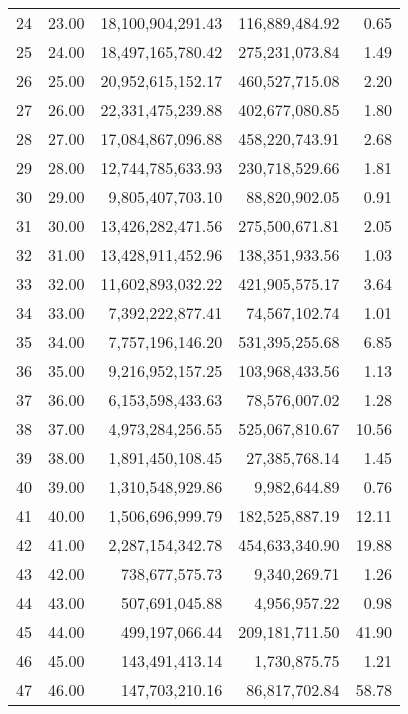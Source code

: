 \begin{table}[ht]
\begin{tabular}{rrrrr}
  24 & 23.00 & 18,100,904,291.43 & 116,889,484.92 & 0.65 \\ 
  25 & 24.00 & 18,497,165,780.42 & 275,231,073.84 & 1.49 \\ 
  26 & 25.00 & 20,952,615,152.17 & 460,527,715.08 & 2.20 \\ 
  27 & 26.00 & 22,331,475,239.88 & 402,677,080.85 & 1.80 \\ 
  28 & 27.00 & 17,084,867,096.88 & 458,220,743.91 & 2.68 \\ 
  29 & 28.00 & 12,744,785,633.93 & 230,718,529.66 & 1.81 \\ 
  30 & 29.00 & 9,805,407,703.10 & 88,820,902.05 & 0.91 \\ 
  31 & 30.00 & 13,426,282,471.56 & 275,500,671.81 & 2.05 \\ 
  32 & 31.00 & 13,428,911,452.96 & 138,351,933.56 & 1.03 \\ 
  33 & 32.00 & 11,602,893,032.22 & 421,905,575.17 & 3.64 \\ 
  34 & 33.00 & 7,392,222,877.41 & 74,567,102.74 & 1.01 \\ 
  35 & 34.00 & 7,757,196,146.20 & 531,395,255.68 & 6.85 \\ 
  36 & 35.00 & 9,216,952,157.25 & 103,968,433.56 & 1.13 \\ 
  37 & 36.00 & 6,153,598,433.63 & 78,576,007.02 & 1.28 \\ 
  38 & 37.00 & 4,973,284,256.55 & 525,067,810.67 & 10.56 \\ 
  39 & 38.00 & 1,891,450,108.45 & 27,385,768.14 & 1.45 \\ 
  40 & 39.00 & 1,310,548,929.86 & 9,982,644.89 & 0.76 \\ 
  41 & 40.00 & 1,506,696,999.79 & 182,525,887.19 & 12.11 \\ 
  42 & 41.00 & 2,287,154,342.78 & 454,633,340.90 & 19.88 \\ 
  43 & 42.00 & 738,677,575.73 & 9,340,269.71 & 1.26 \\ 
  44 & 43.00 & 507,691,045.88 & 4,956,957.22 & 0.98 \\ 
  45 & 44.00 & 499,197,066.44 & 209,181,711.50 & 41.90 \\ 
  46 & 45.00 & 143,491,413.14 & 1,730,875.75 & 1.21 \\ 
  47 & 46.00 & 147,703,210.16 & 86,817,702.84 & 58.78 \\ 
   \hline
\end{tabular}
\end{table}
